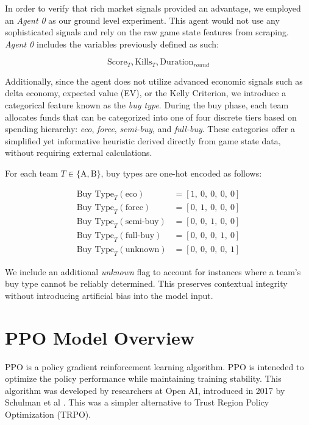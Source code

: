 \documentclass[sigconf]{acmart}
\begin{document}
In order to verify that rich market signals provided an advantage, we employed an \textit{Agent 0} as our ground level experiment. This agent would not use any sophisticated signals and rely on the raw game state features from scraping. \textit{Agent 0} includes the variables previously defined as such:

\begin{equation}
  \text{Score}_{T},
  \text{Kills}_{T},
  \text{Duration}_{round}
\end{equation}

Additionally, since the agent does not utilize advanced economic signals such as delta economy, expected value (EV), or the Kelly Criterion, we introduce a categorical feature known as the \textit{buy type}. During the buy phase, each team allocates funds that can be categorized into one of four discrete tiers based on spending hierarchy: \textit{eco}, \textit{force}, \textit{semi-buy}, and \textit{full-buy}. These categories offer a simplified yet informative heuristic derived directly from game state data, without requiring external calculations.

For each team \( T \in \{\text{A}, \text{B}\} \), buy types are one-hot encoded as follows:

\begin{align}
\text{Buy Type}_T(\text{eco})      &= [1,\ 0,\ 0,\ 0,\ 0] \nonumber \\
\text{Buy Type}_T(\text{force})    &= [0,\ 1,\ 0,\ 0,\ 0] \nonumber \\
\text{Buy Type}_T(\text{semi-buy}) &= [0,\ 0,\ 1,\ 0,\ 0] \nonumber \\
\text{Buy Type}_T(\text{full-buy}) &= [0,\ 0,\ 0,\ 1,\ 0] \nonumber \\
\text{Buy Type}_T(\text{unknown})  &= [0,\ 0,\ 0,\ 0,\ 1]
\end{align}

We include an additional \textit{unknown} flag to account for instances where a team’s buy type cannot be reliably determined. This preserves contextual integrity without introducing artificial bias into the model input.

\section{PPO Model Overview}

PPO is a policy gradient reinforcement learning algorithm. PPO is inteneded to optimize the policy performance while maintaining training stability. This algorithm was developed by researchers at Open AI, introduced in 2017 by Schulman et al \cite{schulman2017proximalpolicyoptimizationalgorithms}. This was a simpler alternative to Trust Region Policy Optimization (TRPO).
\end{document}
